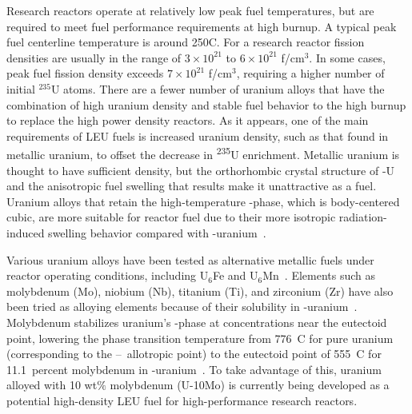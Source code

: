 Research reactors operate at relatively low peak fuel temperatures, but are required to meet fuel performance requirements at high burnup. A typical peak fuel centerline temperature is around 250\textdegree C. For a research reactor fission densities are usually in the range of $3\times10^{21}$ to $6\times10^{21}$ f/cm$^3$. In some cases, peak fuel fission density exceeds $7\times10^{21}$ f/cm$^3$, requiring a higher number of initial $^{235}$U atoms. There are a fewer number of uranium alloys that have the combination of high uranium density and stable fuel behavior to the high burnup to replace the high power density reactors. As it appears, one of the main requirements of LEU fuels is increased uranium density, such as that found in metallic uranium, to offset the decrease in \textsuperscript{235}U enrichment. Metallic uranium is thought to have sufficient density, but the orthorhombic crystal structure of \textalpha-U
and the anisotropic fuel swelling that results make it unattractive as a fuel.
Uranium alloys that retain the high-temperature \textgamma-phase, which is body-centered cubic, are more suitable for reactor fuel due to their more isotropic radiation-induced swelling behavior compared with  \textalpha-uranium~\cite{kittel1993history}.

Various uranium alloys have been tested as alternative metallic fuels under reactor operating conditions, including U$_6$Fe and U$_6$Mn~\cite{meyer2000irradiation,hofman1987irradiation}.
Elements such as molybdenum (Mo), niobium (Nb), titanium (Ti), and zirconium (Zr) have also been tried as alloying elements because of their solubility in \textgamma-uranium~\cite{donze1959stabilisation,giraud1973formation,lopes2013mechanical}. Molybdenum stabilizes uranium's \textgamma-phase at concentrations near the eutectoid point, lowering the phase transition temperature from 776~\textdegree C for pure uranium (corresponding to the \textbeta--\textgamma\ allotropic point) to the eutectoid point of 555~\textdegree C for 11.1~percent molybdenum in \textgamma-uranium~\cite{ASM-Alloy-Mo,Berche2011}. To take advantage of this, uranium alloyed with 10 wt$\%$ molybdenum (U-10Mo) is currently being developed as a potential high-density LEU fuel for high-performance research reactors. 

